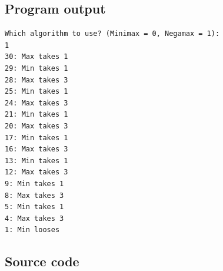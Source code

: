 \documentclass{article}
\begin{document}
\subsection*{Program output}
\begin{lstlisting}
Which algorithm to use? (Minimax = 0, Negamax = 1):
1
30: Max takes 1
29: Min takes 1
28: Max takes 3
25: Min takes 1
24: Max takes 3
21: Min takes 1
20: Max takes 3
17: Min takes 1
16: Max takes 3
13: Min takes 1
12: Max takes 3
9: Min takes 1
8: Max takes 3
5: Min takes 1
4: Max takes 3
1: Min looses

\end{lstlisting}

\subsection*{Source code}
\end{document}
